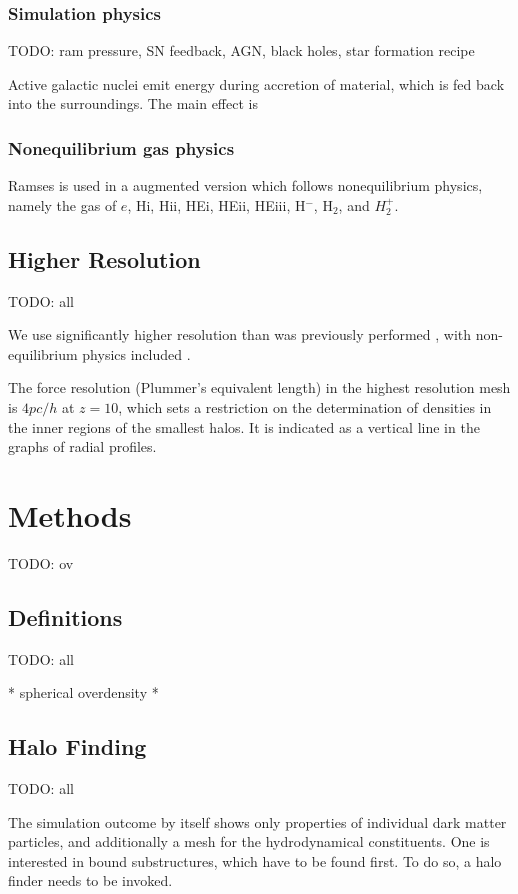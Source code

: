 \documentclass[useAMS,usenatbib]{mn2e}
\begin{document}
\subsubsection{Simulation physics}
TODO: ram pressure, SN feedback, AGN, black holes, star formation recipe

Active galactic nuclei emit energy during accretion of material, which
is fed back into the surroundings. The main effect is

\subsubsection{Nonequilibrium gas physics} {\sc Ramses} is used in a
augmented version which follows nonequilibrium physics, namely the gas
of $e$, {\sc Hi}, {\sc Hii}, {\sc HEi}, {\sc HEii}, {\sc HEiii},
H$^-$, H$_2$, and $H_2^+$.

\subsection{Higher Resolution}
TODO: all

We use significantly higher resolution than was previously performed
\citep{Boley2009}, with non-equilibrium physics included
\citep{Abel1997}.

The force resolution (Plummer's equivalent length) in the highest
resolution mesh is $4pc/h$ at $z=10$, which sets a restriction on the
determination of densities in the inner regions of the smallest
halos. It is indicated as a vertical line in the graphs of radial
profiles.

\section{Methods}
\label{sec:meth}
TODO: ov
\subsection{Definitions}
TODO: all

* spherical overdensity
* 
\subsection{Halo Finding}
TODO: all

The simulation outcome by itself shows only properties of individual
dark matter particles, and additionally a mesh for the hydrodynamical
constituents. One is interested in bound substructures, which have to
be found first. To do so, a halo finder needs to be invoked.
\end{document}

